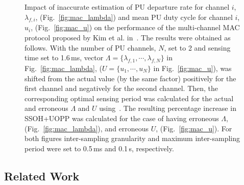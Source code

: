 \documentclass[11pt,draftclsnofoot,journal,onecolumn]{IEEEtran}
\begin{document}
\begin{figure}
\centering
{}
\caption{Impact of inaccurate estimation of PU departure rate for channel $i$, $\lambda_{f,i}$, (Fig.~\ref{fig:mac_lambda}) and mean PU duty cycle for channel $i$, $u_{i}$, (Fig.~\ref{fig:mac_u}) on the performance of the multi-channel MAC protocol proposed by Kim et al. in~\cite{kim_tmc_2008}. The results were obtained as follows. With the number of PU channels, $N$, set to 2 and sensing time set to 1.6\,ms, vector $\Lambda=\{\lambda_{f,1},\cdots,\lambda_{f,N}\}$ in Fig.~\ref{fig:mac_lambda}, ($U=\{u_{1},\cdots,u_{N}\}$ in Fig.~\ref{fig:mac_u}), was shifted from the actual value (by the same factor) positively for the first channel and negatively for the second channel. Then, the corresponding optimal sensing period was calculated for the actual and erroneous $\Lambda$ and $U$ using~\cite[Eq. (1)]{kim_tmc_2008}. The resulting percentage increase in SSOH+UOPP was calculated for the case of having erroneous $\Lambda$, (Fig.~\ref{fig:mac_lambda}), and erroneous $U$, (Fig.~\ref{fig:mac_u}). For both figures inter-sampling granularity and maximum inter-sampling period were set to 0.5\,ms and 0.1\,s, respectively.}
\label{fig:mac_example}
\end{figure}

\subsection{Related Work}
\label{sec:related_work}
\end{document}
